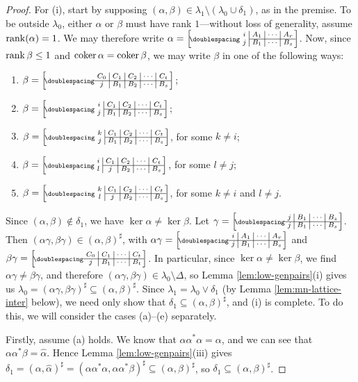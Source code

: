 \begin{lemma}
\begin{proof}
    For (i), start by supposing
    $(\alpha, \beta) \in \lambda_1 \setminus (\lambda_0 \cup \delta_1)$, as in
    the premise.  To be outside $\lambda_0$, either $\alpha$ or $\beta$ must
    have rank $1$---without loss of generality, assume $\operatorname{rank}(\alpha)=1$.  We
    may therefore write
    $\alpha=\bipart{c|c|c|c}{2-4}{i&A_1&\cdots&A_r}{j&B_1&\cdots&B_s}$.  Now,
    since $\operatorname{rank}\beta \leq 1$ and $\operatorname{coker}\alpha = \operatorname{coker}\beta$, we may write
    $\beta$ in one of the following ways:
    \begin{enumerate}[\rm(a)]
    \item $\beta = \bipart{c|c|c|c|c}{1-5}
      {C_0 & C_1 & C_2 & \cdots & C_t}{j & B_1 & B_2 & \cdots & B_s}$;
    \item $\beta = \bipart{c|c|c|c|c}{2-5}
      {i & C_1 & C_2 & \cdots & C_t}{j & B_1 & B_2 & \cdots & B_s}$;
    \item $\beta = \bipart{c|c|c|c|c}{2-5}
      {k & C_1 & C_2 & \cdots & C_t}{j & B_1 & B_2 & \cdots & B_s}$,
      for some $k \neq i$;
    \item $\beta = \bipart{c|c|c|c|c}{2-5}
      {i & C_1 & C_2 & \cdots & C_t}{l & j & B_2 & \cdots & B_s}$,
      for some $l \neq j$;
    \item $\beta = \bipart{c|c|c|c|c}{2-5}
      {k & C_1 & C_2 & \cdots & C_t}{l & j & B_2 & \cdots & B_s}$,
      for some $k \neq i$ and $l \neq j$.
    \end{enumerate}
    Since $(\alpha,\beta) \notin \delta_1$, we have
    $\ker\alpha \neq \ker\beta$.  Let
    $\gamma = \bipart{c|c|c|c}{1-4}
    {j & B_1 & \cdots & B_s}{j & B_1 & \cdots & B_s}$.  Then
    $(\alpha\gamma, \beta\gamma) \in (\alpha,\beta)^\sharp$, with
    $\alpha\gamma = \bipart{c|c|c|c}{1-4}
    {i & A_1 & \cdots & A_r}{j & B_1 & \cdots & B_s}$ and
    $\beta\gamma = \bipart{c|c|c|c}{1-4}
    {C_0 & C_1 & \cdots & C_t}{j & B_1 & \cdots & B_t}$.  In particular,
    since $\ker\alpha \neq \ker\beta$, we find $\alpha\gamma \neq \beta\gamma$,
    and therefore $(\alpha\gamma, \beta\gamma) \in \lambda_0 \setminus \Delta$,
    so Lemma \ref{lem:low-genpairs}(i) gives us
    $\lambda_0=(\alpha\gamma, \beta\gamma)^\sharp
    \subseteq (\alpha, \beta)^\sharp$.
    Since $\lambda_1 = \lambda_0 \vee \delta_1$ (by Lemma
    \ref{lem:mn-lattice-inter} below), we need only show that $\delta_1
    \subseteq (\alpha,\beta)^\sharp$, and (i) is complete.
    To do this, we will consider the cases (a)--(e) separately.

    Firstly, assume (a) holds.  We know that $\alpha \alpha^* \alpha = \alpha$,
    and we can see that $\alpha\alpha^*\beta = \widehat\alpha$.  Hence Lemma
    \ref{lem:low-genpairs}(iii) gives
    $\delta_1 = (\alpha, \widehat\alpha)^\sharp = (\alpha\alpha^*\alpha,
    \alpha\alpha^*\beta)^\sharp \subseteq (\alpha,\beta)^\sharp$, so
    $\delta_1 \subseteq (\alpha, \beta)^\sharp$.


\end{proof}
\end{lemma}
